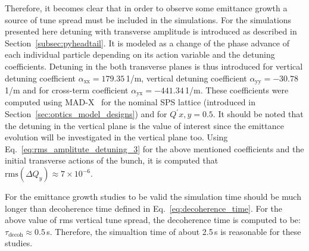Therefore, it becomes clear that in order to observe some emittance growth a source of tune spread must be included in the simulations. For the simulations presented here detuning with transverse amplitude is introduced as described in Section~\ref{subsec:pyheadtail}. It is modeled as a change of the phase advance of each individual particle depending on its action variable and the detuning coefficients. Detuning in the both transverse planes is thus introduced for vertical detuning coefficient $\alpha_\mathrm{xx}=179.35$\,1/m, vertical detuning coefficient $\alpha_\mathrm{yy}=-30.78$\,1/m and for cross-term coefficient $\alpha_\mathrm{yx}=-441.34$\,1/m. These coefficients were computed using MAD-X~\cite{madx} for the nominal SPS lattice (introduced in Section~\ref{sec:optics_model_designs}) and for $Q^\prime{x,y=0.5}$. It should be noted that the detuning in the vertical plane is the value of interest since the emittance evolution will be investigated in the vertical plane too. Using Eq.~\eqref{eq:rms_amplitute_detuning_3} for the above mentioned coefficients and the initial transverse actions of the bunch, it is computed that $\mathrm{rms}(\Delta Q_y)\approx 7 \times 10^{-6}$. 

For the emittance growth studies to be valid the simulation time should be much longer than decoherence time defined in Eq.~\eqref{eq:decoherence_time}. For the above value of rms vertical tune spread, the decoherence time is computed to be: $\tau_\mathrm{decoh} \approx 0.5$\,s. Therefore, the simualtion time of about 2.5\,s is reasonable for these studies.


